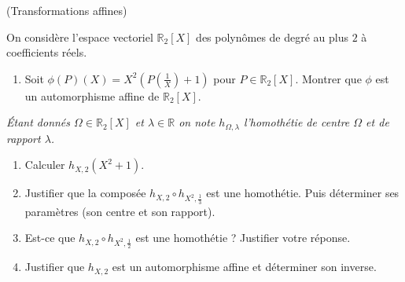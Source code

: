 \documentclass[a4paper,12pt,reqno]{amsart}
\begin{document}
\begin{solution}
\end{solution}

\tsvp
\ifsolutions\else\newpage\fi

\begin{exo} (Transformations affines)

  On considère l'espace vectoriel $\mathbb{R}_{2}[X]$ des polynômes de degré au plus $2$ à coefficients réels.

  \begin{enumerate}
    \item Soit $\phi(P)(X) = X^{2}\left( P(\frac{1}{X}) + 1 \right)$ pour $P \in \mathbb{R}_{2}[X]$. Montrer que $\phi$ est un automorphisme affine de $\mathbb{R}_{2}[X]$.
  \end{enumerate}
  \emph{Étant donnés $\Omega \in \mathbb{R}_{2}[X]$ et $\lambda \in \mathbb{R}$ on note $h_{\Omega,\lambda}$ l'homothétie de centre $\Omega$ et de rapport $\lambda$.}
  \begin{enumerate}[resume]
    \item Calculer $h_{X,2}(X^{2}+1)$.
    \item Justifier que la composée $h_{X,2}\circ h_{X^{2},\frac{1}{3}}$ est une homothétie. Puis déterminer ses paramètres (son centre et son rapport).
    \item Est-ce que $h_{X,2}\circ h_{X^{2},\frac{1}{2}}$ est une homothétie ? Justifier votre réponse.
    \item Justifier que $h_{X,2}$ est un automorphisme affine et déterminer son inverse.
  \end{enumerate}

\end{exo}
\end{document}
